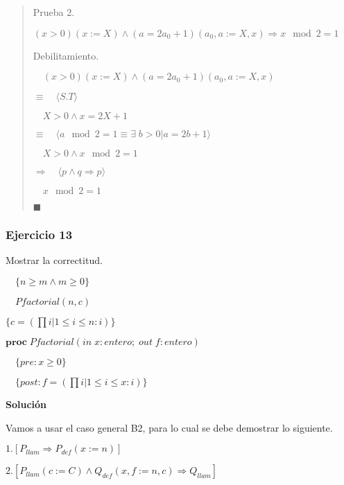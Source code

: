 \documentclass[hidelinks]{article}
\newenvironment{absolutelynopagebreak}
{\Needspace{10\baselineskip}\begin{quote}}
		{\end{quote}}
\begin{document}
\begin{absolutelynopagebreak}
	Prueba 2.\par
	$(x > 0)(x := X) \land (a = 2a_0 + 1)(a_0, a := X, x) \Rightarrow x \mod 2 = 1$\par

	Debilitamiento.\par
	$\quad (x > 0)(x := X) \land (a = 2a_0 + 1)(a_0, a := X, x)$\par
	$\equiv \quad \langle S.T \rangle$\par
	$\quad X > 0 \land x = 2X + 1$\par
	$\equiv \quad \langle a \mod 2 = 1 \equiv \exists \; b > 0 | a = 2b + 1  \rangle$\par
	$\quad X > 0 \land x \mod 2 = 1$\par
	$\Rightarrow \quad \langle p \land q \Rightarrow p  \rangle$\par
	$\quad x \mod 2 = 1$\par
	$\blacksquare$\par
\end{absolutelynopagebreak}

\newpage

\subsubsection{Ejercicio 13}


Mostrar la correctitud.\par

$\quad \{n \geq m \land m \geq 0\}$ \par
$\quad Pfactorial(n,c)$ \par
$\{ c = (\prod i| 1 \leq i \leq n : i)\}$ \par

$\textbf{proc} \; Pfactorial(in \; x: entero; \; out \; f: entero)$ \par
$\quad \{pre: x \geq 0\}$ \par
$\quad \{post: f = (\prod i| 1 \leq i \leq x: i)\}$\par

\textbf{Solución}\par

Vamos a usar el caso general B2, para lo cual se debe demostrar lo siguiente.\par
$1. [P_{llam} \Rightarrow P_{def}(x := n)]$\par
$2. [P_{llam}(c := C) \land Q_{def}(x,f := n,c) \Rightarrow Q_{llam}]$\par
\end{document}
